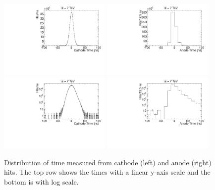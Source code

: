 \begin{figure}
  \begin{center}
      \includegraphics[clip=true, trim=0.0cm 0cm 0.0cm 0cm, width=0.48\textwidth]{figures/timing/CathodeTime}
      \includegraphics[clip=true, trim=0.0cm 0cm 0.0cm 0cm, width=0.48\textwidth]{figures/timing/AnodeTime} \\
      \includegraphics[clip=true, trim=0.0cm 0cm 0.0cm 0cm, width=0.48\textwidth]{figures/timing/CathodeTimeLog}
      \includegraphics[clip=true, trim=0.0cm 0cm 0.0cm 0cm, width=0.48\textwidth]{figures/timing/AnodeTimeLog} \\
      \caption[Distribution of time of anode and cathode hits]
      {Distribution of time measured from cathode (left) and anode (right) hits.
The top row shows the times with a linear y-axis scale and the bottom is with log scale.
	}
      \label{fig:hittime}
  \end{center}
\end{figure}


